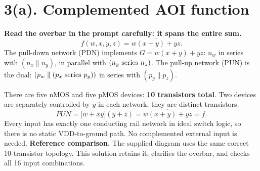 \documentclass[11pt,a4paper]{article}
\newcommand{\VDD}{V_{\mathrm{DD}}}
\newcommand{\VSS}{V_{\mathrm{SS}}}
\newcommand{\MOS}[5]{
  \coordinate (#1) at (#2,#3);
  \coordinate (#1t) at ($(#1)+(0,.55)$);
  \coordinate (#1b) at ($(#1)+(0,-.55)$);
  \draw (#1t)--($(#1)+(0,.30)$)--($(#1)+(-.18,.30)$);
  \draw ($(#1)+(-.18,.34)$)--($(#1)+(-.18,-.34)$);
  \draw ($(#1)+(-.18,-.30)$)--($(#1)+(0,-.30)$)--(#1b);
  \draw ($(#1)+(-.35,.33)$)--($(#1)+(-.35,-.33)$);
  \def\type{#5}\def\ptype{p}
  \ifx\type\ptype
    \draw ($(#1)+(-.78,0)$)--($(#1)+(-.53,0)$);
    \draw ($(#1)+(-.465,0)$) circle (.065);
    \draw ($(#1)+(-.40,0)$)--($(#1)+(-.35,0)$);
  \else
    \draw ($(#1)+(-.78,0)$)--($(#1)+(-.35,0)$);
  \fi
  \node[anchor=east] at ($(#1)+(-.82,0)$) {$#4$};
  \node[anchor=west,font=\scriptsize] at ($(#1)+(.10,0)$) {#1};
}
\begin{document}
\section*{3(a). Complemented AOI function}
\textbf{Read the overbar in the prompt carefully: it spans the entire sum.}
\[
 \boxed{f(w,x,y,z)=\overline{w(x+y)+yz}.}
\]
The pull-down network (PDN) implements $G=w(x+y)+yz$: $n_w$ in series with $(n_x\parallel n_y)$, in parallel with $(n_y\hbox{ series }n_z)$.
The pull-up network (PUN) is the dual:
$(p_w\parallel(p_x\hbox{ series }p_y))$ in series with $(p_y\parallel p_z)$.
\begin{center}
\end{center}
There are five nMOS and five pMOS devices: \textbf{10 transistors total}. Two devices are separately controlled by $y$ in each network; they are distinct transistors.
\[
 PUN=\bigl[\bar w+\bar x\bar y\bigr](\bar y+\bar z)
     =\overline{w(x+y)+yz}=f.
\]
Every input has exactly one conducting rail network in ideal switch logic, so there is no static VDD-to-ground path. No complemented external input is needed.
\textbf{Reference comparison.} The supplied diagram uses the same correct 10-transistor topology. This solution retains it, clarifies the overbar, and checks all 16 input combinations.
\newpage
\end{document}
